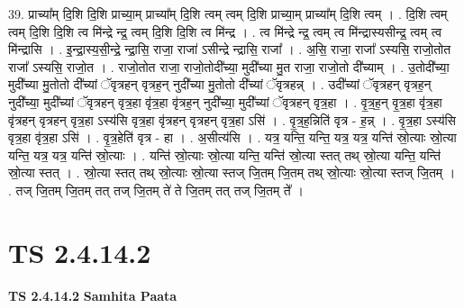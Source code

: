 \documentclass[17pt]{extarticle}
\begin{document}
39. प्राच्या᳚म् दि॒शि दि॒शि प्राच्या॒म् प्राच्या᳚म् दि॒शि त्वम् त्वम् दि॒शि प्राच्या॒म् प्राच्या᳚म् दि॒शि त्वम् । . दि॒शि त्वम् त्वम् दि॒शि दि॒शि त्व मि॑न्द्रे न्द्र॒ त्वम् दि॒शि दि॒शि त्व मि॑न्द्र । . त्व मि॑न्द्रे न्द्र॒ त्वम् त्व मि॑न्द्रास्यसीन्द्र॒ त्वम् त्व मि॑न्द्रासि । . इ॒न्द्रा॒स्य॒सी॒न्द्रे॒ न्द्रा॒सि॒ राजा॒ राजा॑ ऽसीन्द्रे न्द्रासि॒ राजा᳚ । . अ॒सि॒ राजा॒ राजा᳚ ऽस्यसि॒ राजो॒तोत राजा᳚ ऽस्यसि॒ राजो॒त । . राजो॒तोत राजा॒ राजो॒तोदी᳚च्या॒ मुदी᳚च्या मु॒त राजा॒ राजो॒तो दी᳚च्याम् । . उ॒तोदी᳚च्या॒ मुदी᳚च्या मु॒तोतो दी᳚च्यां ॅवृत्रहन् वृत्रह॒न् नुदी᳚च्या मु॒तोतो दी᳚च्यां ॅवृत्रहन्न् । . उदी᳚च्यां ॅवृत्रहन् वृत्रह॒न् नुदी᳚च्या॒ मुदी᳚च्यां ॅवृत्रहन् वृत्र॒हा वृ॑त्र॒हा वृ॑त्रह॒न् नुदी᳚च्या॒ मुदी᳚च्यां ॅवृत्रहन् वृत्र॒हा । . वृ॒त्र॒ह॒न् वृ॒त्र॒हा वृ॑त्र॒हा वृ॑त्रहन् वृत्रहन् वृत्र॒हा ऽस्य॑सि वृत्र॒हा वृ॑त्रहन् वृत्रहन् वृत्र॒हा ऽसि॑ । . वृ॒त्र॒ह॒न्निति॑ वृत्र - ह॒न्न् । . वृ॒त्र॒हा ऽस्य॑सि वृत्र॒हा वृ॑त्र॒हा ऽसि॑ । . वृ॒त्र॒हेति॑ वृत्र - हा । . अ॒सीत्य॑सि । . यत्र॒ यन्ति॒ यन्ति॒ यत्र॒ यत्र॒ यन्ति॑ स्रो॒त्याः स्रो॒त्या यन्ति॒ यत्र॒ यत्र॒ यन्ति॑ स्रो॒त्याः । . यन्ति॑ स्रो॒त्याः स्रो॒त्या यन्ति॒ यन्ति॑ स्रो॒त्या स्तत् तथ् स्रो॒त्या यन्ति॒ यन्ति॑ स्रो॒त्या स्तत् । . स्रो॒त्या स्तत् तथ् स्रो॒त्याः स्रो॒त्या स्तज् जि॒तम् जि॒तम् तथ् स्रो॒त्याः स्रो॒त्या स्तज् जि॒तम् । . तज् जि॒तम् जि॒तम् तत् तज् जि॒तम् ते॑ ते जि॒तम् तत् तज् जि॒तम् ते᳚ । \newline
\pagebreak
{}

\section{ TS 2.4.14.2 }

\textbf{TS 2.4.14.2 } \newline
\textbf{Samhita Paata} \newline
\end{document}
